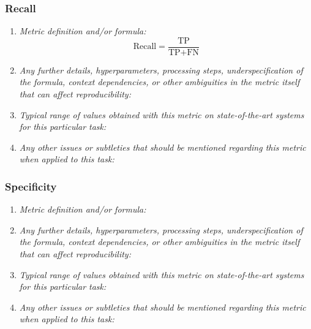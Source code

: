 \documentclass[a4paper,11pt]{article}
\begin{document}
        \subsubsection{Recall}
            \begin{enumerate}[label=\alph*.]
                \item \textit{Metric definition and/or formula:}
                    \begin{equation}
                        \textrm{Recall} = \frac{\textrm{TP}}{\textrm{TP} + \textrm{FN}}
                    \end{equation}
                \bigskip
                \item \textit{Any further details, hyperparameters, processing steps, underspecification of the formula, context dependencies, or other ambiguities in the metric itself that can affect reproducibility:}
                \bigskip
                \item \textit{Typical range of values obtained with this metric on state-of-the-art systems for this particular task:}
                \bigskip
                \item \textit{Any other issues or subtleties that should be mentioned regarding this metric when applied to this task:}
                \bigskip
            \end{enumerate}
        \subsubsection{Specificity}
            \begin{enumerate}[label=\alph*.]
                \item \textit{Metric definition and/or formula:}
                \bigskip
                \item \textit{Any further details, hyperparameters, processing steps, underspecification of the formula, context dependencies, or other ambiguities in the metric itself that can affect reproducibility:}
                \bigskip
                \item \textit{Typical range of values obtained with this metric on state-of-the-art systems for this particular task:}
                \bigskip
                \item \textit{Any other issues or subtleties that should be mentioned regarding this metric when applied to this task:}
                \bigskip
            \end{enumerate}
\end{document}
